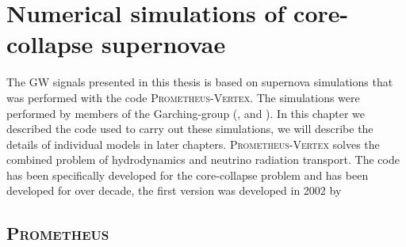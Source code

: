 
\chapter{Numerical simulations of core-collapse supernovae}
The GW signals presented in this thesis is based on 
supernova simulations that was performed with the code \textsc{Prometheus-Vertex}.
The simulations were performed by members of the Garching-group 
(\citealp{hanke_phd}, \citealp{melson_phd} and \citealp{suma_models}).
In this chapter we described the code used to carry out these simulations, we will
describe the details of individual models in later chapters. 
\textsc{Prometheus-Vertex} solves the combined problem of hydrodynamics and neutrino radiation transport.
The code has been specifically developed for the core-collapse problem and has been developed for over
decade, the first version was developed in 2002 by \cite{rampp_02} 

\section{\textsc{Prometheus}}
